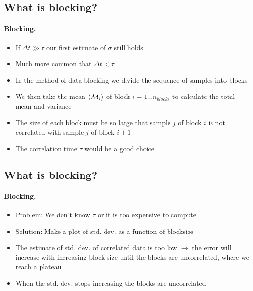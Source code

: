 \documentclass[%
twoside,                 %
final,                   %
10pt]{article}
\begin{document}
    

\subsection*{What is blocking?}

\paragraph{Blocking.}
\begin{itemize}
    \item If $\Delta t\gg\tau$ our first estimate of $\sigma$ still holds

    \item Much more common that $\Delta t<\tau$

    \item In the method of data blocking we divide the sequence of samples into blocks

    \item We then take the mean $\langle {\cal M}_i\rangle$ of block $i=1\ldots n_{blocks}$ to calculate the total mean and variance

    \item The size of each block must be so large that sample $j$ of block $i$ is not correlated with sample $j$ of block $i+1$

    \item The correlation time $\tau$ would be a good choice
\end{itemize}

\noindent



\subsection*{What is blocking?}

\paragraph{Blocking.}
\begin{itemize}
    \item Problem: We don't know $\tau$ or it is too expensive to compute

    \item Solution: Make a plot of std. dev. as a function of blocksize

    \item The estimate of std. dev. of correlated data is too low $\to$ the error will increase with increasing block size until the blocks are uncorrelated, where we reach a plateau

    \item When the std. dev. stops increasing the blocks are uncorrelated
\end{itemize}
\end{document}
